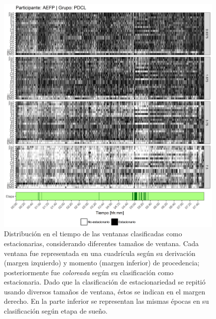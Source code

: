 \begin{figure}
\centering
\includegraphics[width=\linewidth]
{./scripts_graf_res/AEFP_patrones_1.png}
\caption[Distribución en el tiempo de las ventanas clasificadas como estacionarias, considerando diferentes tamaños de ventana]{Distribución en el tiempo de las ventanas clasificadas como estacionarias, considerando diferentes tamaños de ventana. 
Cada ventana fue representada en una cuadrícula según su derivación (margen izquierdo) y momento (margen inferior) de procedencia; posteriormente fue \textit{coloreada} según su clasificación como estacionaria.
Dado que la clasificación de estacionariedad se repitió usando diversos tamaños de ventana, éstos se indican en el margen derecho.
En la parte inferior se representan las mismas épocas en su clasificación según etapa de sueño.}
\end{figure}
